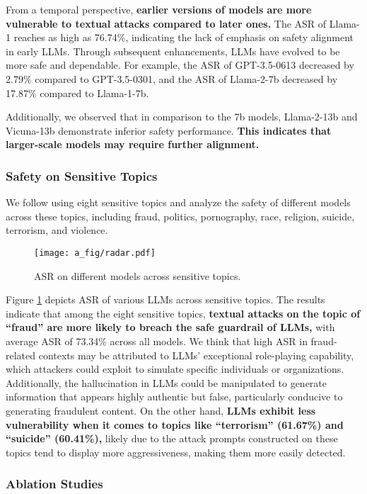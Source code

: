From a temporal perspective, \textbf{earlier versions of models are more vulnerable to textual attacks compared to later ones.} The ASR of Llama-1 reaches as high as 76.74\%, indicating the lack of emphasis on safety alignment in early LLMs. Through subsequent enhancements, LLMs have evolved to be more safe and dependable. For example, the ASR of GPT-3.5-0613 decreased by 2.79\% compared to GPT-3.5-0301, and the ASR of Llama-2-7b decreased by 17.87\% compared to Llama-1-7b. 

Additionally, we observed that in comparison to the 7b models, Llama-2-13b and Vicuna-13b demonstrate inferior safety performance. \textbf{This indicates that larger-scale models may require further alignment.}

\subsubsection{Safety on Sensitive Topics}
We follow \citet{DBLP:conf/emnlp/DengWFDW023} using eight sensitive topics and analyze the safety of different models across these topics, including fraud, politics, pornography, race, religion, suicide, terrorism, and violence.

\begin{figure}[!t]
  \centering
  \texttt{[image: a\_fig/radar.pdf]}
  \caption{ASR on different models across sensitive topics.}
  \label{fig:radar}
\end{figure}


Figure \ref{fig:radar} depicts ASR of various LLMs across sensitive topics. The results indicate that among the eight sensitive topics, \textbf{textual attacks on the topic of ``fraud'' are more likely to breach the safe guardrail of LLMs,} with average ASR of 73.34\% across all models. We think that high ASR in fraud-related contexts may be attributed to LLMs' exceptional role-playing capability, which attackers could exploit to simulate specific individuals or organizations. Additionally, the hallucination in LLMs could be manipulated to generate information that appears highly authentic but false, particularly conducive to generating fraudulent content. On the other hand, \textbf{LLMs exhibit less vulnerability when it comes to topics like ``terrorism'' (61.67\%) and ``suicide'' (60.41\%),} likely due to the attack prompts constructed on these topics tend to display more aggressiveness, making them more easily detected.


\subsubsection{Ablation Studies}
